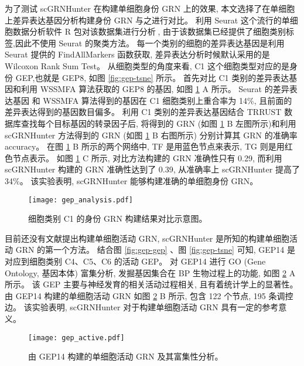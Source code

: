 为了测试 scGRNHunter 在构建单细胞身份 GRN 上的效果,
本文选择了在单细胞上差异表达基因分析构建身份 GRN 与之进行对比。 
利用 Seurat 这个流行的单细胞数据分析软件 R 包对该数据集进行分析,
由于该数据集已经提供了细胞类别标签,因此不使用 Seurat 的聚类方法。
每一个类别的细胞的差异表达基因是利用 Seurat 提供的 FindAllMarkers 函数获取, 
差异表达分析时候默认采用的是 Wilcoxon Rank Sum Test。
从细胞类型的角度来看, 
C1 这个细胞类型对应的是身份 GEP,也就是 GEP8, 如图 \ref{fig:gep-tsne} 所示。
首先对比 C1 类别的差异表达基因和利用 WSSMFA 算法获取的 GEP8 的基因, 如图 \ref{fig:gep-grn-comparison} A 所示。
Seurat 的差异表达基因 和 WSSMFA 算法得到的基因在 C1 细胞类别上重合率为 14\%, 且前面的差异表达得到的基因数目偏多。 
利用 C1 类别的差异表达基因结合 TRRUST 数据库查找每个目标基因的转录因子后, 
将得到的 GRN (如图 \ref{fig:gep-grn-comparison} B 左图所示)和利用 scGRNHunter 方法得到的 GRN (如图 \ref{fig:gep-grn-comparison} B 右图所示)
分别计算其 GRN 的准确率 accuracy。
在图 \ref{fig:gep-grn-comparison} B 所示的两个网络中, TF 是用蓝色节点来表示, TG 则是用红色节点表示。
如图 \ref{fig:gep-grn-comparison} C 所示, 对比方法构建的 GRN 准确性只有 0.29, 
而利用 scGRNHunter 构建的 GRN 准确性达到了 0.39, 从准确率上 scGRNHunter 提高了 34\%。
该实验表明, scGRNHunter 能够构建准确的单细胞身份 GRN。

\begin{figure}[!htbp]
    \centering
    \texttt{[image: gep\_analysis.pdf]}
    \caption{细胞类别 C1 的身份 GRN 构建结果对比示意图。}
    \label{fig:gep-grn-comparison}
\end{figure}


目前还没有文献提出构建单细胞活动 GRN, 
scGRNHunter 是所知的构建单细胞活动 GRN 的第一个方法。
结合图 \ref{fig:gep-gep} 、图 \ref{fig:gep-tsne} 可知, 
GEP14 是对应到细胞类别 C4、C5、C6 的活动 GEP。
对 GEP14 进行 GO (Gene Ontology, 基因本体) 富集分析, 发掘基因集合在 BP 生物过程上的功能, 如图 \ref{fig:gep-active} A 所示。
该 GEP 主要与神经发育的相关活动过程相关, 且有着统计学上的显著性。
由 GEP14 构建的单细胞活动 GRN 如图 \ref{fig:gep-active} B 所示, 包含 122 个节点, 195 条调控边。
该实验表明, scGRNHunter 对于构建单细胞活动 GRN 具有一定的参考意义。

\begin{figure}[!htbp]
    \centering
    \texttt{[image: gep\_active.pdf]}
    \caption{由 GEP14 构建的单细胞活动 GRN 及其富集性分析。}
    \label{fig:gep-active}
\end{figure}


